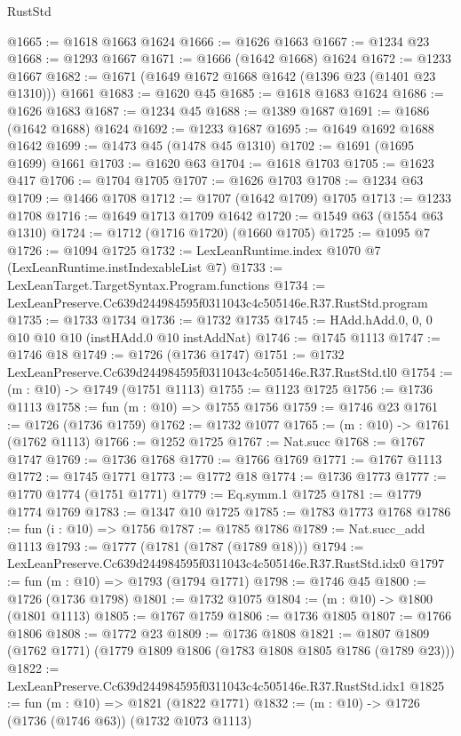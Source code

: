 \begin{lexlean}{RustStd}
\begin{coremodule}
@1665 := @1618 @1663 @1624
@1666 := @1626 @1663
@1667 := @1234 @23
@1668 := @1293 @1667
@1671 := @1666 (@1642 @1668) @1624
@1672 := @1233 @1667
@1682 := @1671 (@1649 @1672 @1668 @1642 (@1396 @23 (@1401 @23 @1310))) @1661
@1683 := @1620 @45
@1685 := @1618 @1683 @1624
@1686 := @1626 @1683
@1687 := @1234 @45
@1688 := @1389 @1687
@1691 := @1686 (@1642 @1688) @1624
@1692 := @1233 @1687
@1695 := @1649 @1692 @1688 @1642
@1699 := @1473 @45 (@1478 @45 @1310)
@1702 := @1691 (@1695 @1699) @1661
@1703 := @1620 @63
@1704 := @1618 @1703
@1705 := @1623 @417
@1706 := @1704 @1705
@1707 := @1626 @1703
@1708 := @1234 @63
@1709 := @1466 @1708
@1712 := @1707 (@1642 @1709) @1705
@1713 := @1233 @1708
@1716 := @1649 @1713 @1709 @1642
@1720 := @1549 @63 (@1554 @63 @1310)
@1724 := @1712 (@1716 @1720) (@1660 @1705)
@1725 := @1095 @7
@1726 := @1094 @1725
@1732 := LexLeanRuntime.index @1070 @7 (LexLeanRuntime.instIndexableList @7)
@1733 := LexLeanTarget.TargetSyntax.Program.functions
@1734 := LexLeanPreserve.Cc639d244984595f0311043c4c505146e.R37.RustStd.program
@1735 := @1733 @1734
@1736 := @1732 @1735
@1745 := HAdd.hAdd.{0, 0, 0} @10 @10 @10 (instHAdd.{0} @10 instAddNat)
@1746 := @1745 @1113
@1747 := @1746 @18
@1749 := @1726 (@1736 @1747)
@1751 := @1732 LexLeanPreserve.Cc639d244984595f0311043c4c505146e.R37.RustStd.tl0
@1754 := (m : @10) -> @1749 (@1751 @1113)
@1755 := @1123 @1725
@1756 := @1736 @1113
@1758 := fun (m : @10) => @1755 @1756
@1759 := @1746 @23
@1761 := @1726 (@1736 @1759)
@1762 := @1732 @1077
@1765 := (m : @10) -> @1761 (@1762 @1113)
@1766 := @1252 @1725
@1767 := Nat.succ
@1768 := @1767 @1747
@1769 := @1736 @1768
@1770 := @1766 @1769
@1771 := @1767 @1113
@1772 := @1745 @1771
@1773 := @1772 @18
@1774 := @1736 @1773
@1777 := @1770 @1774 (@1751 @1771)
@1779 := Eq.symm.{1} @1725
@1781 := @1779 @1774 @1769
@1783 := @1347 @10 @1725
@1785 := @1783 @1773 @1768
@1786 := fun (i : @10) => @1756
@1787 := @1785 @1786
@1789 := Nat.succ_add @1113
@1793 := @1777 (@1781 (@1787 (@1789 @18)))
@1794 := LexLeanPreserve.Cc639d244984595f0311043c4c505146e.R37.RustStd.idx0
@1797 := fun (m : @10) => @1793 (@1794 @1771)
@1798 := @1746 @45
@1800 := @1726 (@1736 @1798)
@1801 := @1732 @1075
@1804 := (m : @10) -> @1800 (@1801 @1113)
@1805 := @1767 @1759
@1806 := @1736 @1805
@1807 := @1766 @1806
@1808 := @1772 @23
@1809 := @1736 @1808
@1821 := @1807 @1809 (@1762 @1771) (@1779 @1809 @1806 (@1783 @1808 @1805 @1786 (@1789 @23)))
@1822 := LexLeanPreserve.Cc639d244984595f0311043c4c505146e.R37.RustStd.idx1
@1825 := fun (m : @10) => @1821 (@1822 @1771)
@1832 := (m : @10) -> @1726 (@1736 (@1746 @63)) (@1732 @1073 @1113)

\end{coremodule}
\end{lexlean}
